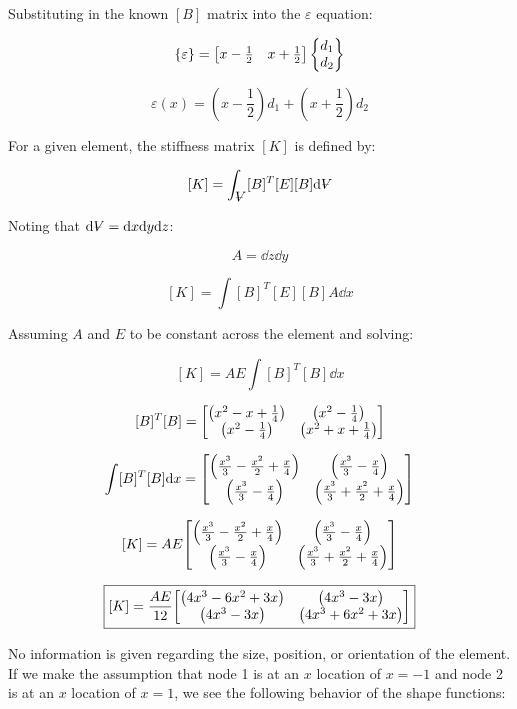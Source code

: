 \documentclass[../main.tex]{subfiles}
\begin{document}
Substituting in the known \([B]\) matrix into the \(\varepsilon\) equation:

\[
    \{\varepsilon\} = \mqty[x - \frac{1}{2} & x + \frac{1}{2}]
    \begin{Bmatrix}
        d_1\\d_2
    \end{Bmatrix}
\]

\[
    \varepsilon(x) = \left({x - \frac{1}{2}}\right)d_1 + \left({x + \frac{1}{2}}\right)d_2
\]


For a given element, the stiffness matrix \([K]\) is defined by:

\[
    [K] = \int_\volume [B]^T [E] [B] \dd \volume
\]

Noting that \(\dd \volume = \dd x \dd y \dd z\):

\[
    A = \dd z \dd y
\]

\[
    [K] = \int [B]^T [E] [B] A \dd x
\]

Assuming \(A\) and \(E\) to be constant across the element and solving:

\[
    [K] = AE \int [B]^T [B] \dd x
\]

\[
    [B]^T [B] = 
    \mqty[\left({x^2-x+\frac{1}{4}}\right) & \left({x^2 - \frac{1}{4}}\right) \\ \left({x^2 - \frac{1}{4}}\right) & \left({x^2+x+\frac{1}{4}}\right)]
\]

\[
    \int [B]^T [B] \dd x = 
    \mqty[\left({\frac{x^3}{3} - \frac{x^2}{2} + \frac{x}{4}}\right) & \left({\frac{x^3}{3} - \frac{x}{4}}\right) \\ \left({\frac{x^3}{3} - \frac{x}{4}}\right) & \left({\frac{x^3}{3} + \frac{x^2}{2} + \frac{x}{4}}\right)]
\]

\[
    [K] = AE \mqty[\left({\frac{x^3}{3} - \frac{x^2}{2} + \frac{x}{4}}\right) & \left({\frac{x^3}{3} - \frac{x}{4}}\right) \\ \left({\frac{x^3}{3} - \frac{x}{4}}\right) & \left({\frac{x^3}{3} + \frac{x^2}{2} + \frac{x}{4}}\right)]
\]

\[
    \boxed{
    [K] = \frac{AE}{12} \mqty[\left({4x^3 - 6x^2 + 3x}\right) & \left({4x^3-3x}\right) \\ \left({4x^3-3x}\right) & \left({4x^3 + 6x^2 + 3x}\right)]
    }
\]

No information is given regarding the size, position, or orientation of the element.
If we make the assumption that node 1 is at an \(x\) location of \(x=-1\) and node 2 is at an \(x\) location of \(x=1\), we see the following behavior of the shape functions:
\end{document}
